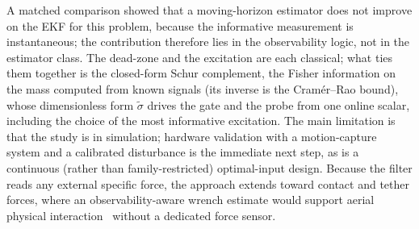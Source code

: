 \documentclass[lettersize,journal]{IEEEtran}
\begin{document}
A matched comparison showed that a moving-horizon estimator does not improve on
the EKF for this problem, because the informative measurement is instantaneous;
the contribution therefore lies in the observability logic, not in the estimator
class. The dead-zone and the excitation are each classical; what ties them together
is the closed-form Schur complement, the Fisher information on the mass computed from
known signals (its inverse is the Cram\'er--Rao bound), whose dimensionless form
$\tilde\sigma$ drives the gate and the probe from one online scalar, including the
choice of the most informative excitation. The main
limitation is that the study is in simulation; hardware validation with a
motion-capture system and a calibrated disturbance is the immediate next step, as
is a continuous (rather than family-restricted) optimal-input design.
Because the filter reads any external specific force, the approach extends toward
contact and tether forces, where an observability-aware wrench estimate would
support aerial physical interaction~\cite{ollero2022past,augugliaro2013admittance} without a dedicated force sensor.



\end{document}
